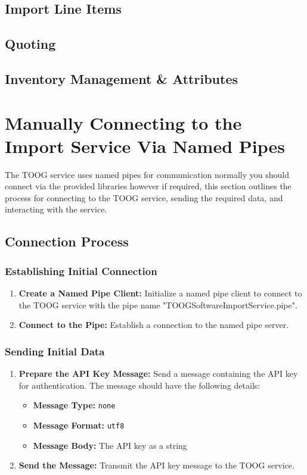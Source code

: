 \documentclass{memoir}
\begin{document}
	\subsection{Import Line Items}
	\subsection{Quoting}
	
	\subsection{Inventory Management \& Attributes}
	\pagebreak
	
	\section{Manually Connecting to the Import Service Via Named Pipes}
	
	The TOOG service uses named pipes for communication normally you should connect via the provided libraries however if required, this section outlines the process for connecting to the TOOG service, sending the required data, and interacting with the service.
	
	\subsection{Connection Process}
	
	\subsubsection{Establishing Initial Connection}
	\begin{enumerate}
		\item \textbf{Create a Named Pipe Client:} Initialize a named pipe client to connect to the TOOG service with the pipe name "TOOGSoftwareImportService.pipe".
		\item \textbf{Connect to the Pipe:} Establish a connection to the named pipe server.
	\end{enumerate}
	
	\subsubsection{Sending Initial Data}
	\begin{enumerate}
		\item \textbf{Prepare the API Key Message:} Send a message containing the API key for authentication. The message should have the following details:
		\begin{itemize}
			\item \textbf{Message Type:} \texttt{none}
			\item \textbf{Message Format:} \texttt{utf8}
			\item \textbf{Message Body:} The API key as a string
		\end{itemize}
		\item \textbf{Send the Message:} Transmit the API key message to the TOOG service.
	\end{enumerate}
	
\end{document}
